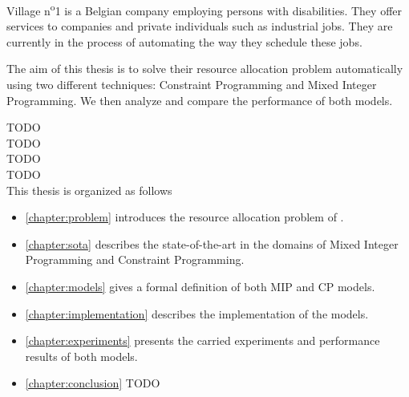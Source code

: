 \documentclass[../thesis.tex]{subfiles}
\begin{document}
Village n\textsuperscript{o}1 is a Belgian company employing persons with disabilities.
They offer services to companies and private individuals such as industrial jobs.
They are currently in the process of automating the way they schedule these jobs. 


The aim of this thesis is to solve their resource allocation problem
automatically using two different techniques: Constraint Programming and Mixed Integer Programming.
We then analyze and compare the performance of both models.


TODO \\ 
TODO\\ 
TODO\\ 
TODO\\



This thesis is organized as follows

\begin{itemize}
  \item[] \autoref{chapter:problem} introduces the resource allocation problem of \vone.
  \item[] \autoref{chapter:sota} describes the state-of-the-art in the domains of Mixed Integer Programming and Constraint Programming. 
  \item[] \autoref{chapter:models} gives a formal definition of both MIP and CP models.
  \item[] \autoref{chapter:implementation} describes the implementation of the models.
  \item[] \autoref{chapter:experiments} presents the carried experiments and performance results of both models.
  \item[] \autoref{chapter:conclusion} TODO  
\end{itemize}
\end{document}
